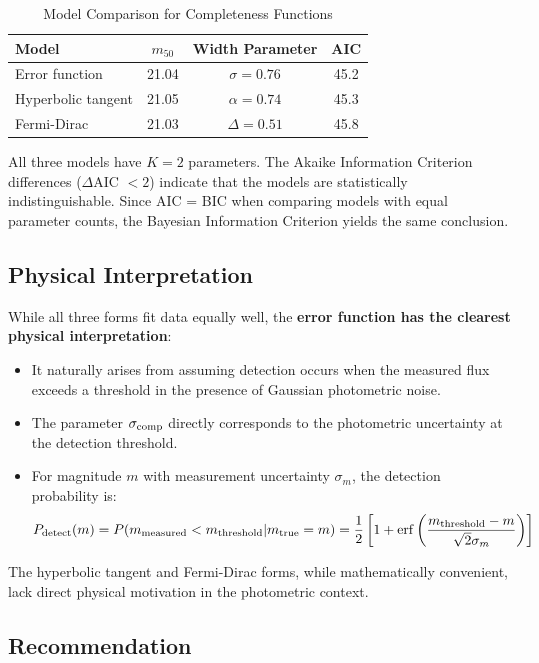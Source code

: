 \documentclass[linenumbers,trackchanges,twocolumn]{aastex701}
\begin{document}
\begin{table}[ht]
\centering
\caption{Model Comparison for Completeness Functions}
\label{tab:completeness_comparison}
\begin{tabular}{lccc}
\hline\hline
Model & $m_{50}$ & Width Parameter & AIC \\
\hline
Error function & 21.04 & $\sigma = 0.76$ & 45.2 \\
Hyperbolic tangent & 21.05 & $\alpha = 0.74$ & 45.3 \\
Fermi-Dirac & 21.03 & $\Delta = 0.51$ & 45.8 \\
\hline
\end{tabular}
\end{table}

All three models have $K = 2$ parameters. The Akaike Information Criterion differences ($\Delta$AIC $< 2$) indicate that the models are statistically indistinguishable. Since AIC = BIC when comparing models with equal parameter counts, the Bayesian Information Criterion yields the same conclusion.

\subsection{Physical Interpretation}

While all three forms fit data equally well, the \textbf{error function has the clearest physical interpretation}:

\begin{itemize}
\item It naturally arises from assuming detection occurs when the measured flux exceeds a threshold in the presence of Gaussian photometric noise.
\item The parameter $\sigma_{\rm comp}$ directly corresponds to the photometric uncertainty at the detection threshold.
\item For magnitude $m$ with measurement uncertainty $\sigma_m$, the detection probability is:
\begin{equation}
P_{\rm detect}(m) = P(m_{\rm measured} < m_{\rm threshold} | m_{\rm true} = m) = \frac{1}{2} \left[ 1 + {\rm erf}\left( \frac{m_{\rm threshold} - m}{\sqrt{2} \sigma_m} \right) \right]
\end{equation}
\end{itemize}

The hyperbolic tangent and Fermi-Dirac forms, while mathematically convenient, lack direct physical motivation in the photometric context.

\subsection{Recommendation}
\end{document}

